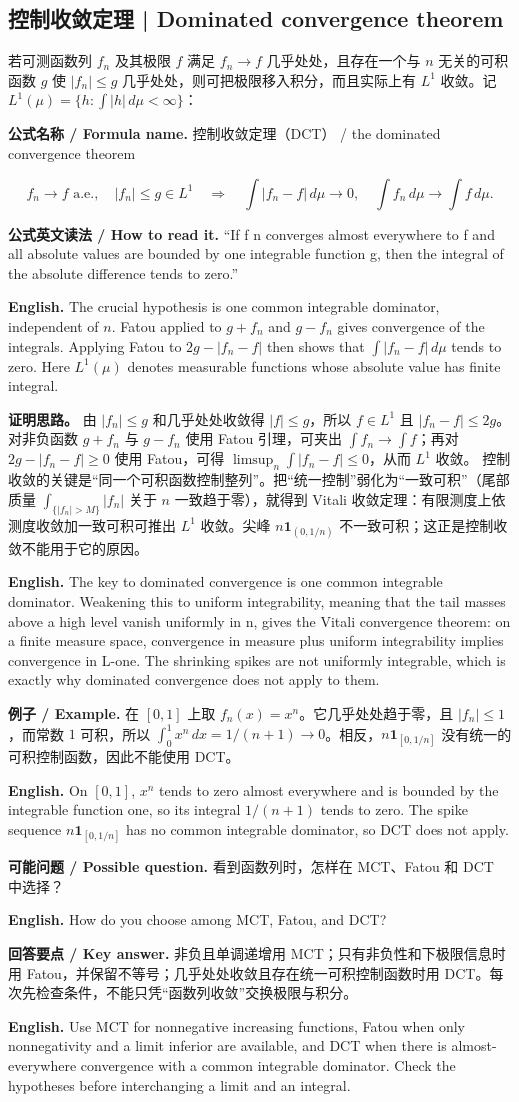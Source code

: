 \documentclass[UTF8,11pt,a4paper]{ctexart}
\newcommand{\EN}[1]{\par\noindent\textbf{English.} #1\par}
\newcommand{\READ}[1]{\par\noindent\textbf{公式英文读法 / How to read it.} #1\par}
\let\APSsubsection\subsection
\renewcommand{\subsection}[1]{\Needspace{6\baselineskip}\APSsubsection{#1}}
\newcommand{\FORMULA}[2]{\par\Needspace{3\baselineskip}\noindent\textbf{公式名称 / Formula name.} #1 / #2\par}
\newcommand{\EX}[2]{\par\noindent\textbf{例子 / Example.} #1\par\EN{#2}}
\newcommand{\ASK}[4]{\par\noindent\textbf{可能问题 / Possible question.} #1\par\EN{#2}\noindent\textbf{回答要点 / Key answer.} #3\par\EN{#4}\medskip}
\begin{document}
\subsection{控制收敛定理 | Dominated convergence theorem}
\noindent 若可测函数列 $f_n$ 及其极限 $f$ 满足 $f_n\to f$ 几乎处处，且存在一个与 $n$ 无关的可积函数 $g$ 使 $|f_n|\le g$ 几乎处处，则可把极限移入积分，而且实际上有 $L^1$ 收敛。记 $L^1(\mu)=\{h:\int|h|\,d\mu<\infty\}$：
\FORMULA{控制收敛定理（DCT）}{the dominated convergence theorem}
\[
f_n\to f\text{ a.e.},\quad |f_n|\le g\in L^1
\quad\Longrightarrow\quad
\int|f_n-f|\,d\mu\to0,
\quad \int f_n\,d\mu\to\int f\,d\mu.
\]
\READ{“If f n converges almost everywhere to f and all absolute values are bounded by one integrable function g, then the integral of the absolute difference tends to zero.”}
\EN{The crucial hypothesis is one common integrable dominator, independent of $n$. Fatou applied to $g+f_n$ and $g-f_n$ gives convergence of the integrals. Applying Fatou to $2g-|f_n-f|$ then shows that $\int|f_n-f|\,d\mu$ tends to zero. Here $L^1(\mu)$ denotes measurable functions whose absolute value has finite integral.}
\noindent\textbf{证明思路。} 由 $|f_n|\le g$ 和几乎处处收敛得 $|f|\le g$，所以 $f\in L^1$ 且 $|f_n-f|\le2g$。对非负函数 $g+f_n$ 与 $g-f_n$ 使用 Fatou 引理，可夹出 $\int f_n\to\int f$；再对 $2g-|f_n-f|\ge0$ 使用 Fatou，可得 $\limsup_n\int|f_n-f|\le0$，从而 $L^1$ 收敛。
\noindent 控制收敛的关键是“同一个可积函数控制整列”。把“统一控制”弱化为“一致可积”（尾部质量 $\int_{\{|f_n|>M\}}|f_n|$ 关于 $n$ 一致趋于零），就得到 Vitali 收敛定理：有限测度上依测度收敛加一致可积可推出 $L^1$ 收敛。尖峰 $n\mathbf1_{(0,1/n)}$ 不一致可积；这正是控制收敛不能用于它的原因。
\EN{The key to dominated convergence is one common integrable dominator. Weakening this to uniform integrability, meaning that the tail masses above a high level vanish uniformly in n, gives the Vitali convergence theorem: on a finite measure space, convergence in measure plus uniform integrability implies convergence in L-one. The shrinking spikes are not uniformly integrable, which is exactly why dominated convergence does not apply to them.}

\EX{在 $[0,1]$ 上取 $f_n(x)=x^n$。它几乎处处趋于零，且 $|f_n|\le1$，而常数 $1$ 可积，所以 $\int_0^1x^n\,dx=1/(n+1)\to0$。相反，$n\mathbf1_{[0,1/n]}$ 没有统一的可积控制函数，因此不能使用 DCT。}{On $[0,1]$, $x^n$ tends to zero almost everywhere and is bounded by the integrable function one, so its integral $1/(n+1)$ tends to zero. The spike sequence $n\mathbf1_{[0,1/n]}$ has no common integrable dominator, so DCT does not apply.}
\ASK{看到函数列时，怎样在 MCT、Fatou 和 DCT 中选择？}{How do you choose among MCT, Fatou, and DCT?}{非负且单调递增用 MCT；只有非负性和下极限信息时用 Fatou，并保留不等号；几乎处处收敛且存在统一可积控制函数时用 DCT。每次先检查条件，不能只凭“函数列收敛”交换极限与积分。}{Use MCT for nonnegative increasing functions, Fatou when only nonnegativity and a limit inferior are available, and DCT when there is almost-everywhere convergence with a common integrable dominator. Check the hypotheses before interchanging a limit and an integral.}
\end{document}
